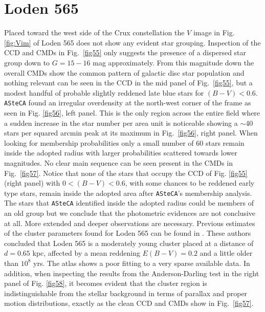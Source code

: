 \documentclass[draft]{aa}
\begin{document}
\section{Loden 565}

Placed toward the west side of the Crux constellation the $V$ image in Fig. 
\ref{fig:Vim} of Loden 565 does not show any evident star grouping. Inspection
of the CCD and CMDs in Fig.~\ref{fig55} only suggests the presence of a
dispersed star group down to $G=15-16$ mag approximately. From this magnitude
down the overall CMDs show the common pattern of galactic disc star population
and nothing relevant can be seen in the CCD in the mid panel of
Fig.~\ref{fig55}, but a modest handful of probable slightly reddened late blue
stars for $(B-V)<0.6$.\\

\texttt{ASteCA} found an irregular overdensity at the north-west corner of the
frame as seen in Fig. \ref{fig56}, left panel. This is the only region across the
entire field where a sudden increase in the star number per area unit is
noticeable showing a $\sim$40 stars per squared arcmin peak at its maximum in
Fig.~\ref{fig56}, right panel.
%
When looking for membership probabilities only a small number of 60 stars
remain inside the adopted radius with larger probabilities
scattered towards lower magnitudes.
No clear main sequence can be seen present in the CMDs in Fig.~\ref{fig57}.
Notice that none of the stars that
occupy the CCD of Fig. \ref{fig55} (right panel) with $0<(B-V)<0.6$, with some
chances to be reddened early type stars, remain inside the adopted area after 
\texttt{ASteCA}'s membership analysis. The stars that \texttt{ASteCA}
identified inside the adopted radius could be members of an old group but we
conclude that the photometric evidences are not conclusive at all.
%
More extended and deeper observations are necessary. Previous estimates of the
cluster parameters found for Loden 565 can be found in \cite{Kharchenko_2005}.
These authors concluded that Loden 565 is a moderately young cluster placed at a
distance of $d=0.65$ kpc, affected by a mean reddening $E(B-V)= 0.2$ and
a little older than $10^8$ yrs. The \cite{Kharchenko_2005} atlas shows a
poor fitting to a very sparse available data. In addition, when inspecting the
results from the Anderson-Darling test in the right panel of Fig. \ref{fig58},
it becomes evident that the cluster region is indistinguishable from the
stellar background in terms of parallax and proper motion distributions,
exactly as the clean CCD and CMDs show in Fig.~\ref{fig57}.\\
\end{document}

